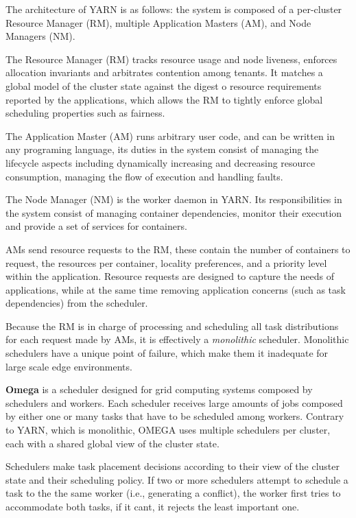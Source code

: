 The architecture of YARN is as follows: the system is composed of a per-cluster Resource Manager (RM), multiple Application Masters (AM), and Node Managers (NM).

The Resource Manager (RM) tracks resource usage and node liveness, enforces allocation invariants and arbitrates contention among tenants. It matches a global model of the cluster state against the digest o resource requirements reported by the applications, which allows the RM to tightly enforce global scheduling properties such as fairness.

The Application Master (AM) runs arbitrary user code, and can be written in any programing language, its duties in the system consist of managing the lifecycle aspects including dynamically increasing and decreasing resource consumption, managing the flow of execution and handling faults. 

The Node Manager (NM) is the worker daemon in YARN. Its responsibilities in the system consist of managing container dependencies, monitor their execution and provide a set of services for containers. 

AMs send resource requests to the RM, these contain the number of containers to request, the resources per container, locality preferences, and a priority level within the application. Resource requests are designed to capture the needs of applications, while at the same time removing application concerns (such as task dependencies) from the scheduler.

Because the RM is in charge of processing and scheduling all task distributions for each request made by AMs, it is effectively a \textit{monolithic} scheduler. Monolithic schedulers have a unique point of failure, which make them it inadequate for large scale edge environments.

\textbf{Omega} \cite{41684} is a scheduler designed for grid computing systems composed by schedulers and workers. Each scheduler receives large amounts of jobs composed by either one or many tasks that  have to be scheduled among workers. Contrary to YARN, which is monolithic, OMEGA uses multiple schedulers per cluster, each with a shared global view of the cluster state.

Schedulers make task placement decisions according to their view of the cluster state and their scheduling policy. If two or more schedulers attempt to schedule a task to the the same worker (i.e., generating a conflict), the worker first tries to accommodate both tasks, if it cant, it rejects the least important one.

